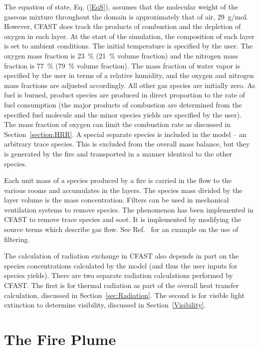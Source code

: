 \documentclass[12pt,twoside]{book}
\begin{document}
The equation of state, Eq. (\ref{EoS}), assumes that the molecular weight of the gaseous mixture throughout the domain is approximately that of air, 29~g/mol. However, CFAST does track the products of combustion and the depletion of oxygen in each layer. At the start of the simulation, the composition of each layer is set to ambient conditions. The initial temperature is specified by the user. The oxygen mass fraction is 23~\% (21~\% volume fraction) and the nitrogen mass fraction is 77~\% (79~\% volume fraction). The mass fraction of water vapor is specified by the user in terms of a relative humidity, and the oxygen and nitrogen mass fractions are adjusted accordingly. All other gas species are initially zero.  As fuel is burned, product species are produced in direct proportion to the rate of fuel consumption (the major products of combustion are determined from the specified fuel molecule and the minor species yields are specified by the user). The mass fraction of oxygen can limit the combustion rate as discussed in Section~\ref{section:HRR}. A special separate species is included in the model -- an arbitrary trace species. This is excluded from the overall mass balance, but they is generated by the fire and transported in a manner identical to the other species.

Each unit mass of a species produced by a fire is carried in the flow to the various rooms and accumulates in the layers. The species mass divided by the layer volume is the mass concentration. Filters can be used in mechanical ventilation systems to remove species. The phenomenon has been implemented in CFAST to remove trace species and soot. It is implemented by modifying the source terms which describe gas flow. See Ref.~\cite{Jones:2008} for an example on the use of filtering.

The calculation of radiation exchange in CFAST also depends in part on the species concentrations calculated by the model (and thus the user inputs for species yields). There are two separate radiation calculations performed by CFAST. The first is for thermal radiation as part of the overall heat transfer calculation, discussed in Section~\ref{sec:Radiation}. The second is for visible light extinction to determine visibility, discussed in Section~\ref{Visibility}.

%
%

\chapter{The Fire Plume}
\label{sec:TheFire}
\end{document}
